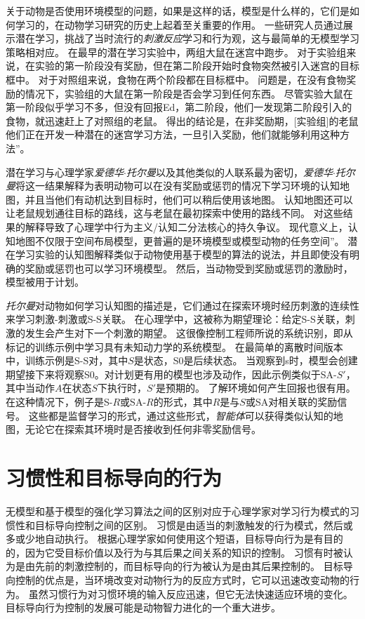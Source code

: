 {{{关于动物是否使用环境模型的问题，如果是这样的话，模型是什么样的，它们是如何学习的，在动物学习研究的历史上起着至关重要的作用。
一些研究人员通过展示潜在学习，挑战了当时流行的\textit{刺激反应}学习和行为观，这与最简单的无模型学习策略相对应。
在最早的潜在学习实验中，两组大鼠在迷宫中跑步。
对于实验组来说，在实验的第一阶段没有奖励，但在第二阶段开始时食物突然被引入迷宫的目标框中。
对于对照组来说，食物在两个阶段都在目标框中。
问题是，在没有食物奖励的情况下，实验组的大鼠在第一阶段是否会学习到任何东西。
尽管实验大鼠在第一阶段似乎学习不多，但没有回报Ed，第二阶段，他们一发现第二阶段引入的食物，就迅速赶上了对照组的老鼠。
得出的结论是，在非奖励期，[实验组]的老鼠他们正在开发一种潜在的迷宫学习方法，一旦引入奖励，他们就能够利用这种方法”\cite{blodgett1929effect}。



潜在学习与心理学家\textit{爱德华$\cdot$托尔曼}以及其他类似的人联系最为密切，\textit{爱德华$\cdot$托尔曼}将这一结果解释为表明动物可以在没有奖励或惩罚的情况下学习环境的认知地图，并且当他们有动机达到目标时，他们可以稍后使用该地图\cite{tolman1948cognitive}。
认知地图还可以让老鼠规划通往目标的路线，这与老鼠在最初探索中使用的路线不同。
对这些结果的解释导致了心理学中行为主义/认知二分法核心的持久争议。
现代意义上，认知地图不仅限于空间布局模型，更普遍的是环境模型或模型动物的任务空间”\cite{wilson2014orbitofrontal}。
潜在学习实验的认知图解释类似于动物使用基于模型的算法的说法，并且即使没有明确的奖励或惩罚也可以学习环境模型。
然后，当动物受到奖励或惩罚的激励时，模型被用于计划。


\textit{托尔曼}对动物如何学习认知图的描述是，它们通过在探索环境时经历刺激的连续性来学习刺激-刺激或S-S关联。
在心理学中，这被称为期望理论：给定S-S关联，刺激的发生会产生对下一个刺激的期望。
这很像控制工程师所说的系统识别，即从标记的训练示例中学习具有未知动力学的系统模型。
在最简单的离散时间版本中，训练示例是S-S对，其中$S$是状态，S0是后续状态。
当观察到s时，模型会创建期望接下来将观察S0。对计划更有用的模型也涉及动作，因此示例类似于SA-$S'$，其中当动作$ A $在状态$ S $下执行时，$ S' $是预期的。
了解环境如何产生回报也很有用。在这种情况下，例子是S-$ R $或SA-$ R $的形式，其中$ R $是与$ S $或SA对相关联的奖励信号。
这些都是监督学习的形式，通过这些形式，\textit{智能体}可以获得类似认知的地图，无论它在探索其环境时是否接收到任何非零奖励信号。


\section{习惯性和目标导向的行为} \label{sec:habitual_behavior}

无模型和基于模型的强化学习算法之间的区别对应于心理学家对学习行为模式的习惯性和目标导向控制之间的区别。
习惯是由适当的刺激触发的行为模式，然后或多或少地自动执行。
根据心理学家如何使用这个短语，目标导向行为是有目的的，因为它受目标价值以及行为与其后果之间关系的知识的控制。
习惯有时被认为是由先前的刺激控制的，而目标导向的行为被认为是由其后果控制的\cite{dickinson1980contemporary,dickinson1985actions}。
目标导向控制的优点是，当环境改变对动物行为的反应方式时，它可以迅速改变动物的行为。
虽然习惯行为对习惯环境的输入反应迅速，但它无法快速适应环境的变化。
目标导向行为控制的发展可能是动物智力进化的一个重大进步。


}}}
